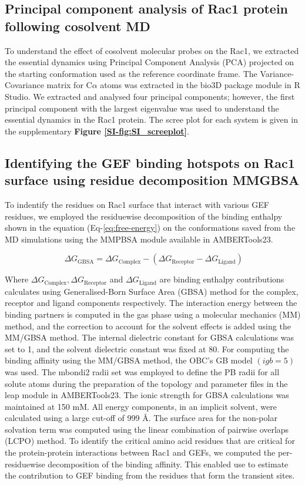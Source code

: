 \documentclass[12pt,a4paper]{achemso}
\begin{document}
\subsection{Principal component analysis of Rac1 protein following cosolvent MD}
To understand the effect of cosolvent molecular probes on the Rac1, we extracted the essential dynamics using Principal Component Analysis (PCA) projected on the starting conformation used as the reference coordinate frame. The Variance-Covariance matrix for C$\alpha$ atoms was extracted in the bio3D package\cite{bio3d} module in R Studio. We extracted and analysed four principal components; however, the first principal component with the largest eigenvalue was used to understand the essential dynamics in the Rac1 protein. The scree plot for each system is given in the supplementary \textbf{Figure \ref{SI-fig:SI_screeplot}}.

\subsection{Identifying the GEF binding hotspots on Rac1 surface using residue decomposition MMGBSA}

To indentify the residues on Rac1 surface that interact with various GEF residues, we employed the residuewise decomposition of the binding enthalpy shown in the equation (Eq-\ref{eq:free-energy}) on the conformations saved from the MD simulations using the MMPBSA module\cite{mmpbsa} available in AMBERTools23.

\begin{equation} \label{eq:free-energy}
     \   {\Delta}G_{\text{GBSA}} = {\Delta}G_{\text{Complex}} - ( {\Delta}G_{\text{Receptor}} - {\Delta}G_{\text{Ligand}})
\end{equation}

Where  ${\Delta}G_{\text{Complex}}, {\Delta}G_{\text{Receptor}}$ and $ {\Delta}G_{\text{Ligand}}$ are binding enthalpy contributions calculates using Generalised-Born Surface Area (GBSA) method for the complex, receptor and ligand components respectively. The interaction energy between the binding partners is computed in the gas phase using a molecular mechanics (MM) method, and the correction to account for the solvent effects is added using the MM/GBSA method. The internal dielectric constant for GBSA calculations was set to 1, and the solvent dielectric constant was fixed at 80. For computing the binding affinity using the MM/GBSA method, the OBC’s GB model\cite{igb5} $ (igb = 5) $ was used. The mbondi2 radii set was employed to define the PB radii for all solute atoms during the preparation of the topology and parameter files in the leap module in AMBERTools23. The ionic strength for GBSA calculations was maintained at 150 mM. All energy components, in an implicit solvent, were calculated using a large cut-off of 999 \r{A}. The surface area for the non-polar solvation term was computed using the linear combination of pairwise overlaps (LCPO) method\cite{lcpo}. To identify the critical amino acid residues that are critical for the protein-protein interactions between Rac1 and GEFs, we computed the per-residuewise decomposition of the binding affinity. This enabled use to estimate the contribution to GEF binding from the residues that form the transient sites.
\end{document}

